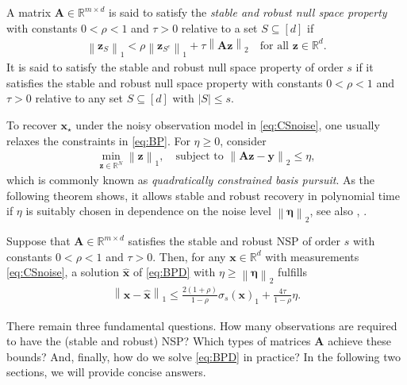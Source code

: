 \documentclass{svproc}
\newcommand{\bA}{\boldsymbol{A}}
\newcommand{\bx}{\boldsymbol{x}}
\newcommand{\by}{\boldsymbol{y}}
\newcommand{\bz}{\boldsymbol{z}}
\newcommand{\Eta}{\boldsymbol{\eta}}
\newcommand{\0}{\boldsymbol{0}}
\newcommand{\1}{\boldsymbol{1}}
\renewcommand{\subset}{\subseteq}
\renewcommand{\hat}{\widehat}
\def\R{\mathbb{R}}
\newcommand{\pnorm}[2]{\left\| #1 \right\|_{#2}}
\begin{document}
\begin{definition} \label{def:srNSP}
    A matrix $\bA \in \R^{m\times d}$ is said to satisfy the \emph{stable and robust null space property} with constants $0 < \rho < 1$ and $\tau > 0$ relative to a set $S \subset [d]$ if
	\begin{align*}
		\pnorm{\bz_S}{1} < \rho \pnorm{\bz_{S^c}}{1} + \tau \pnorm{\bA\bz}{2} \quad \text{for all } \bz \in \R^d.
	\end{align*}
	It is said to satisfy the stable and robust null space property of order $s$ if it satisfies the stable and robust null space property with constants $0 < \rho < 1$ and $\tau > 0$ relative to any set $S \subset [d]$ with $|S| \le s$.
\end{definition}

To recover $\bx_\star$ under the noisy observation model in \eqref{eq:CSnoise}, one usually relaxes the constraints in \eqref{eq:BP}. For $\eta \ge 0$, consider
\begin{align} \label{eq:BPD}
    \min_{\bz \in \R^N} \pnorm{\bz}{1}, \quad \text{subject to } \pnorm{\bA\bz - \by}{2} \le \eta,
\end{align}
which is commonly known as \emph{quadratically constrained basis pursuit}. As the following theorem shows, it allows stable and robust recovery in polynomial time if $\eta$ is suitably chosen in dependence on the noise level $\pnorm{\Eta}{2}$, see also \cite{codade09}, \cite[Theorem 4.19]{foucart2013mathematical}.

\begin{theorem}\label{thm:srNSP}
    Suppose that $\bA \in \R^{m\times d}$ satisfies the stable and robust NSP of order $s$ with constants $0 < \rho < 1$ and $\tau > 0$. Then, for any $\bx \in \R^d$ with measurements \eqref{eq:CSnoise}, a solution $\hat{\bx}$ of \eqref{eq:BPD} with $\eta \ge \pnorm{\Eta}{2}$ fulfills
    \begin{align} \label{eq:srNSP}
        \pnorm{\bx - \hat{\bx}}{1} \le \frac{2(1+\rho)}{1-\rho} \sigma_s(\bx)_1 + \frac{4\tau}{1-\rho} \eta. 
    \end{align}
\end{theorem}

There remain three fundamental questions. How many observations are required to have the (stable and robust) NSP? Which types of matrices $\bA$ achieve these bounds? And, finally, how do we solve \eqref{eq:BPD} in practice? In the following two sections, we will provide concise answers.
\end{document}
